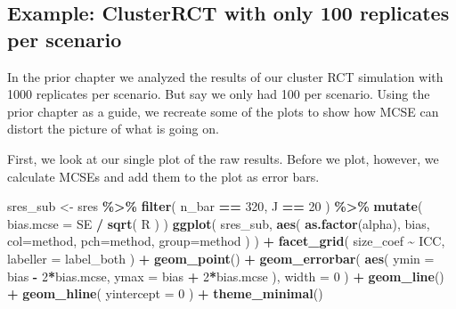 \documentclass[
]{book}
\newenvironment{Shaded}{\begin{snugshade}}{\end{snugshade}}
\newcommand{\AttributeTok}[1]{\textcolor[rgb]{0.13,0.29,0.53}{#1}}
\newcommand{\DecValTok}[1]{\textcolor[rgb]{0.00,0.00,0.81}{#1}}
\newcommand{\FunctionTok}[1]{\textcolor[rgb]{0.13,0.29,0.53}{\textbf{#1}}}
\newcommand{\NormalTok}[1]{#1}
\newcommand{\OtherTok}[1]{\textcolor[rgb]{0.56,0.35,0.01}{#1}}
\newcommand{\SpecialCharTok}[1]{\textcolor[rgb]{0.81,0.36,0.00}{\textbf{#1}}}
\begin{document}
\subsection{Example: ClusterRCT with only 100 replicates per scenario}\label{example-clusterrct-with-only-100-replicates-per-scenario}

In the prior chapter we analyzed the results of our cluster RCT simulation with 1000 replicates per scenario.
But say we only had 100 per scenario.
Using the prior chapter as a guide, we recreate some of the plots to show how MCSE can distort the picture of what is going on.

First, we look at our single plot of the raw results.
Before we plot, however, we calculate MCSEs and add them to the plot as error bars.

\begin{Shaded}
\begin{Highlighting}[]
\NormalTok{sres\_sub }\OtherTok{\textless{}{-}}\NormalTok{ sres }\SpecialCharTok{\%\textgreater{}\%}
  \FunctionTok{filter}\NormalTok{( n\_bar }\SpecialCharTok{==} \DecValTok{320}\NormalTok{, J }\SpecialCharTok{==} \DecValTok{20}\NormalTok{ ) }\SpecialCharTok{\%\textgreater{}\%}
  \FunctionTok{mutate}\NormalTok{( }\AttributeTok{bias.mcse =}\NormalTok{ SE }\SpecialCharTok{/} \FunctionTok{sqrt}\NormalTok{( R ) )}
\FunctionTok{ggplot}\NormalTok{( sres\_sub, }\FunctionTok{aes}\NormalTok{( }\FunctionTok{as.factor}\NormalTok{(alpha), bias, }
                       \AttributeTok{col=}\NormalTok{method, }\AttributeTok{pch=}\NormalTok{method, }\AttributeTok{group=}\NormalTok{method ) ) }\SpecialCharTok{+}
  \FunctionTok{facet\_grid}\NormalTok{( size\_coef }\SpecialCharTok{\textasciitilde{}}\NormalTok{ ICC, }\AttributeTok{labeller =}\NormalTok{ label\_both ) }\SpecialCharTok{+}
  \FunctionTok{geom\_point}\NormalTok{() }\SpecialCharTok{+} 
  \FunctionTok{geom\_errorbar}\NormalTok{( }\FunctionTok{aes}\NormalTok{( }\AttributeTok{ymin =}\NormalTok{ bias }\SpecialCharTok{{-}} \DecValTok{2}\SpecialCharTok{*}\NormalTok{bias.mcse, }
                      \AttributeTok{ymax =}\NormalTok{ bias }\SpecialCharTok{+} \DecValTok{2}\SpecialCharTok{*}\NormalTok{bias.mcse ), }
                 \AttributeTok{width =} \DecValTok{0}\NormalTok{ ) }\SpecialCharTok{+}
  \FunctionTok{geom\_line}\NormalTok{() }\SpecialCharTok{+}
  \FunctionTok{geom\_hline}\NormalTok{( }\AttributeTok{yintercept =} \DecValTok{0}\NormalTok{ ) }\SpecialCharTok{+}
  \FunctionTok{theme\_minimal}\NormalTok{() }
\end{Highlighting}
\end{Shaded}
\end{document}
